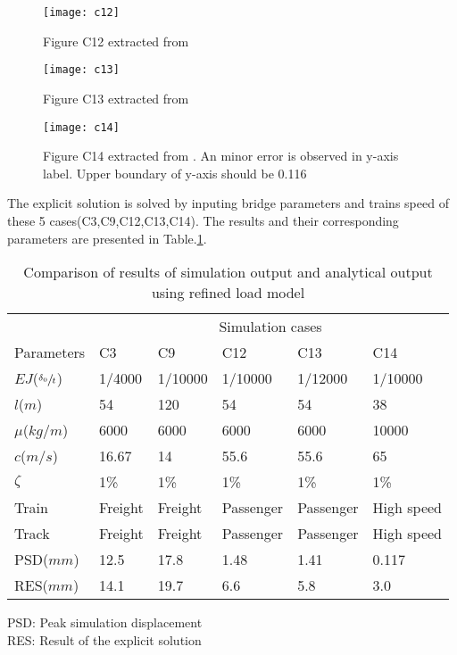 \begin{figure}[h!]
    \centering
    \texttt{[image: c12]}
    \caption{Figure C12 extracted from \citet{d181dt329} }
    \label{fig:c12}
\end{figure}

\begin{figure}[h!]
    \centering
    \texttt{[image: c13]}
    \caption{Figure C13 extracted from \citet{d181dt329} }
    \label{fig:c13}
\end{figure}

\begin{figure}[h!]
    \centering
    \texttt{[image: c14]}
    \caption{Figure C14 extracted from \citet{d181dt329}. An minor error is observed in y-axis label. Upper boundary of y-axis should be 0.116 }
    \label{fig:c14}
\end{figure}

The explicit solution is solved by inputing bridge parameters and trains speed of these 5 cases(C3,C9,C12,C13,C14). The results and their corresponding parameters are presented in Table.\ref{tab:comparisonresultssimulationanalytical}.

\begin{table}[h!]
    \centering
    \caption{Comparison of results of simulation output and analytical output using refined load model}
    \begin{tabularx}{\textwidth}{X|XXXXX}
        \hline
        & \multicolumn{5}{c}{Simulation cases} \\
        Parameters & C3 & C9 & C12 & C13 & C14\\
        \hline
        $EJ$($\sfrac{\delta_0}{t}$) &1/4000 & 1/10000& 1/10000 & 1/12000 & 1/10000\\
        $l$($m$) & 54 & 120 & 54 & 54 & 38\\
        $\mu$($kg/m$) & 6000 & 6000 & 6000 & 6000 & 10000\\
        $c$($m/s$) &16.67 & 14 & 55.6 & 55.6 & 65\\
        $\zeta$ & 1\% & 1\% & 1\% & 1\% & 1\%\\
        Train & Freight & Freight & Passenger & Passenger & High speed \\
        Track & Freight & Freight & Passenger  & Passenger  & High speed \\
        \hline
        PSD($mm$) & 12.5 & 17.8 & 1.48 & 1.41 & 0.117\\
        RES($mm$) & 14.1 & 19.7 & 6.6 & 5.8 & 3.0 \\
        \hline
    \end{tabularx}
    \begin{flushleft}
    	\vspace{0.5cm}
    	PSD: Peak simulation displacement \\
    	RES: Result of the explicit solution
    \end{flushleft}
    \label{tab:comparisonresultssimulationanalytical}
\end{table}

